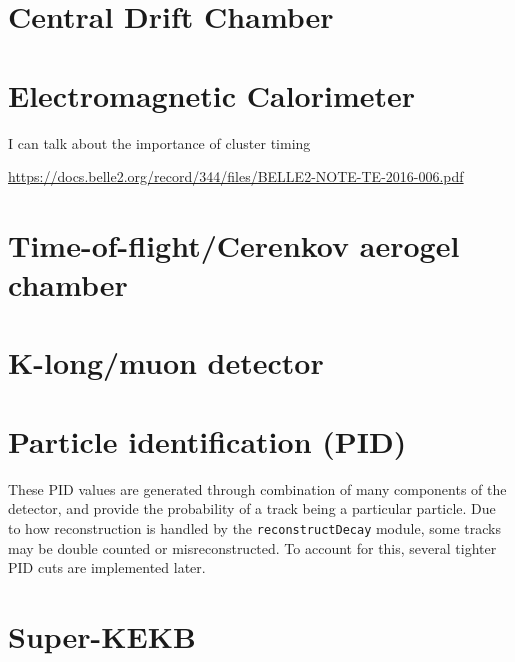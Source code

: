 \documentclass[12pt]{thesis}  %
\begin{document}
\section{Central Drift Chamber}



\section{Electromagnetic Calorimeter}

I can talk about the importance of cluster timing

\url{https://docs.belle2.org/record/344/files/BELLE2-NOTE-TE-2016-006.pdf}



\section{Time-of-flight/Cerenkov aerogel chamber}



\section{K-long/muon detector}




\section{Particle identification (PID)}


These PID values are generated through combination of many components of the detector, and provide the probability of a track being a particular particle. Due to how reconstruction is handled by the \texttt{reconstructDecay} module, some tracks may be double counted or misreconstructed. To account for this, several tighter PID cuts are implemented later.





\section{Super-KEKB}
\end{document}
